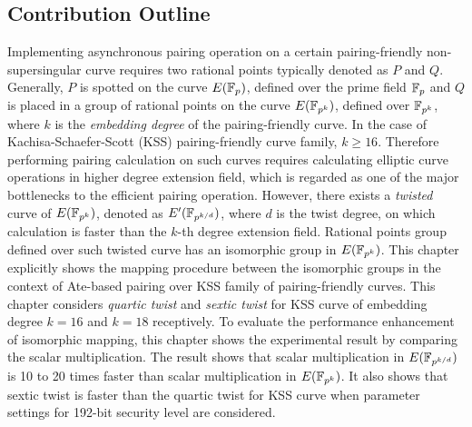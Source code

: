 \subsection{Contribution Outline}
Implementing asynchronous pairing operation on  a certain pairing-friendly non-supersingular curve requires two rational points typically denoted as $P$ and $Q$. 
Generally, $P$ is spotted on the curve  $E(\mathbb{F}_p)$, defined over the prime field $\mathbb{F}_p$ and $Q$ is placed in a group of rational points on the curve $E(\mathbb{F}_{p^k})$, defined over $\mathbb{F}_{p^k}$, where $k$ is the \textit{embedding degree} of the pairing-friendly curve. 
In the case of  Kachisa-Schaefer-Scott (KSS) pairing-friendly curve family, $k \geq 16$.
Therefore performing pairing calculation on such curves requires calculating elliptic curve operations in higher degree extension field, which is regarded as one of the major bottlenecks to the efficient pairing operation. 
However, there exists a \textit{twisted} curve of $E(\mathbb{F}_{p^k})$, denoted as  $E'(\mathbb{F}_{p^{k/d}})$, where $d$ is the twist degree, on which calculation is faster than the $k$-th degree extension field. 
Rational points group defined over such twisted curve has an isomorphic group in $E(\mathbb{F}_{p^k})$. 
This chapter explicitly shows the mapping  procedure between the isomorphic groups in the context of Ate-based pairing over KSS family of pairing-friendly curves. 
This chapter considers \textit{quartic twist} and \textit{sextic twist} for KSS curve of embedding degree $k =16$ and $k=18$ receptively. 
To evaluate the performance enhancement of isomorphic mapping, this chapter shows the experimental result by comparing the scalar multiplication. 
The result shows that scalar multiplication in $E(\mathbb{F}_{p^{k/d}})$ is 10 to 20  times faster than scalar multiplication in $E(\mathbb{F}_{p^k})$. 
It also shows that sextic twist is faster than the quartic twist for KSS curve when parameter settings for 192-bit security level are considered. 

